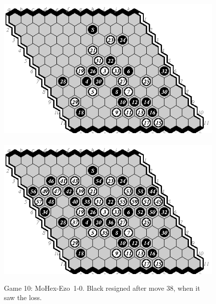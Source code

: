 \documentclass{icga}
\def\Eo{\mbox{\sc Ezo}}
\def\Mx{\mbox{\sc MoHex}}
\begin{document}
\begin{figure}[hbp]
\includegraphics[scale=1.3]{games/pix/10-me-1-0.eps}\hspace*{-1cm}\
\includegraphics[scale=1.3]{games/pix/10-me-completion.eps}
\caption{Game 10: \Mx-\Eo\ 1-0. Black resigned after move 38, when it saw the loss.}
\end{figure}
\end{document}
